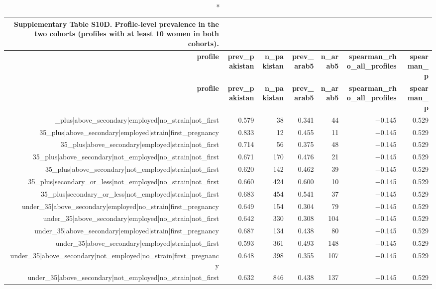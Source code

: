 \documentclass[10pt]{article}
\begin{document}
\tiny
\setlength{\tabcolsep}{2pt}
\begin{longtable}{rrrrrrr}
\caption*{\textbf{Supplementary Table S10D.} Profile-level prevalence in the two cohorts (profiles with at least 10 women in both cohorts).}\\
\toprule
\textbf{profile} & \textbf{prev\_pakistan} & \textbf{n\_pakistan} & \textbf{prev\_arab5} & \textbf{n\_arab5} & \textbf{spearman\_rho\_all\_profiles} & \textbf{spearman\_p} \\
\midrule
\endfirsthead
\toprule
\textbf{profile} & \textbf{prev\_pakistan} & \textbf{n\_pakistan} & \textbf{prev\_arab5} & \textbf{n\_arab5} & \textbf{spearman\_rho\_all\_profiles} & \textbf{spearman\_p} \\
\midrule
\endhead
\bottomrule
\endfoot
35\_plus|above\_secondary|employed|no\_strain|not\_first & 0.579 & 38 & 0.341 & 44 & $-$0.145 & 0.529 \\
35\_plus|above\_secondary|employed|strain|first\_pregnancy & 0.833 & 12 & 0.455 & 11 & $-$0.145 & 0.529 \\
35\_plus|above\_secondary|employed|strain|not\_first & 0.714 & 56 & 0.375 & 48 & $-$0.145 & 0.529 \\
35\_plus|above\_secondary|not\_employed|no\_strain|not\_first & 0.671 & 170 & 0.476 & 21 & $-$0.145 & 0.529 \\
35\_plus|above\_secondary|not\_employed|strain|not\_first & 0.620 & 142 & 0.462 & 39 & $-$0.145 & 0.529 \\
35\_plus|secondary\_or\_less|not\_employed|no\_strain|not\_first & 0.660 & 424 & 0.600 & 10 & $-$0.145 & 0.529 \\
35\_plus|secondary\_or\_less|not\_employed|strain|not\_first & 0.683 & 454 & 0.541 & 37 & $-$0.145 & 0.529 \\
under\_35|above\_secondary|employed|no\_strain|first\_pregnancy & 0.649 & 154 & 0.304 & 79 & $-$0.145 & 0.529 \\
under\_35|above\_secondary|employed|no\_strain|not\_first & 0.642 & 330 & 0.308 & 104 & $-$0.145 & 0.529 \\
under\_35|above\_secondary|employed|strain|first\_pregnancy & 0.687 & 134 & 0.438 & 80 & $-$0.145 & 0.529 \\
under\_35|above\_secondary|employed|strain|not\_first & 0.593 & 361 & 0.493 & 148 & $-$0.145 & 0.529 \\
under\_35|above\_secondary|not\_employed|no\_strain|first\_pregnancy & 0.648 & 398 & 0.355 & 107 & $-$0.145 & 0.529 \\
under\_35|above\_secondary|not\_employed|no\_strain|not\_first & 0.632 & 846 & 0.438 & 137 & $-$0.145 & 0.529 \\

\end{longtable}
\end{document}
